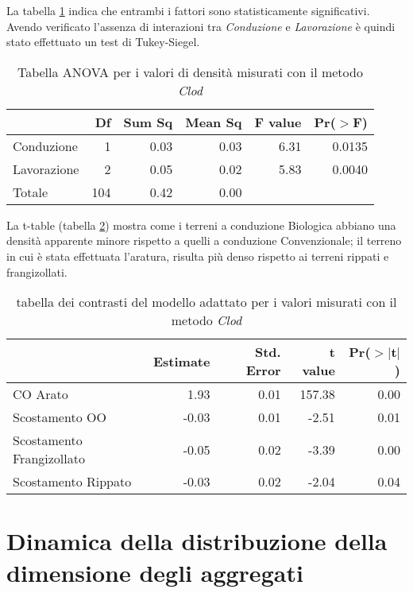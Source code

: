 \documentclass[a4paper]{article}
\begin{document}
La tabella \ref{tab:anova piccoli aggregati} indica che entrambi i
fattori sono statisticamente significativi. Avendo verificato
l'assenza di interazioni tra \emph{Conduzione} e \emph{Lavorazione} è quindi stato effettuato un test
di Tukey-Siegel.


\begin{table}[ht]
\centering
\caption{ Tabella ANOVA per i valori di densità misurati con il metodo \emph{Clod}} 
\label{tab:anova piccoli aggregati}
\begin{tabular}{lrrrrr}
  \hline
 & Df & Sum Sq & Mean Sq & F value & Pr($>$F) \\ 
  \hline
Conduzione & 1 & 0.03 & 0.03 & 6.31 & 0.0135 \\ 
  Lavorazione & 2 & 0.05 & 0.02 & 5.83 & 0.0040 \\ 
  Totale & 104 & 0.42 & 0.00 &  &  \\ 
   \hline
\end{tabular}
\end{table}
La t-table %
(tabella \ref{tab:sommario piccoli aggregati}) mostra come i terreni a
conduzione Biologica abbiano una densità apparente minore rispetto a
quelli a conduzione Convenzionale; il terreno in cui \`e stata effettuata
l'aratura, risulta pi\`u denso rispetto ai terreni rippati e
frangizollati.



\begin{table}[ht]
\centering
\caption{tabella dei contrasti del modello adattato per i valori misurati con il metodo \emph{Clod}} 
\label{tab:sommario piccoli aggregati}
\begin{tabular}{lrrrr}
  \hline
 & Estimate & Std. Error & t value & Pr($>$$|$t$|$) \\ 
  \hline
CO Arato & 1.93 & 0.01 & 157.38 & 0.00 \\ 
  Scostamento OO & -0.03 & 0.01 & -2.51 & 0.01 \\ 
  Scostamento Frangizollato & -0.05 & 0.02 & -3.39 & 0.00 \\ 
  Scostamento Rippato & -0.03 & 0.02 & -2.04 & 0.04 \\ 
   \hline
\end{tabular}
\end{table}


\section{Dinamica della distribuzione della dimensione degli
  aggregati}
\end{document}
